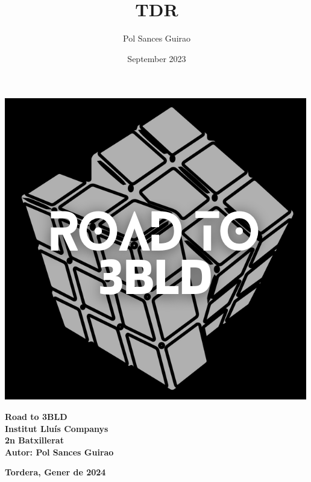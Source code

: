 \documentclass[oneside]{book}
\title{TDR}
\author{Pol Sances Guirao}
\date{September 2023}
\begin{document}
\begin{titlepage}
    \centering
    \vspace*{\fill}
    
    \begin{minipage}{0.3\textwidth}
        \includegraphics[width=\textwidth]{img/logos/logo_TdR.png}
    \end{minipage}
    \hfill
    \begin{minipage}{0.6\textwidth}
        \begin{center}
            \textbf{\Huge Road to 3BLD}\\
            \vspace{0.5cm}
            \textbf{\LARGE Institut Lluís Companys}\\
            \vspace{0.5cm}
            \textbf{\Large 2n Batxillerat}\\
            \vspace{0.5cm}
            \textbf{\large Autor: Pol Sances Guirao}
        \end{center}
    \end{minipage}

    \vfill
    \vspace*{\fill}
    
    \textbf{Tordera, Gener de 2024}
\end{titlepage}
\end{document}
